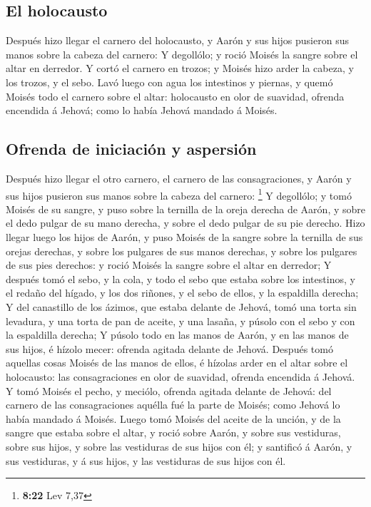 \hypertarget{el-holocausto}{%
\subsection{El holocausto}\label{el-holocausto}}

 Después hizo llegar el carnero del holocausto, y Aarón y
sus hijos pusieron sus manos sobre la cabeza del carnero:
 Y degollólo; y roció Moisés la sangre sobre el altar en
derredor.  Y cortó el carnero en trozos; y Moisés hizo
arder la cabeza, y los trozos, y el sebo.  Lavó luego con
agua los intestinos y piernas, y quemó Moisés todo el carnero sobre el
altar: holocausto en olor de suavidad, ofrenda encendida á Jehová; como
lo había Jehová mandado á Moisés.

\hypertarget{ofrenda-de-iniciaciuxf3n-y-aspersiuxf3n}{%
\subsection{Ofrenda de iniciación y
aspersión}\label{ofrenda-de-iniciaciuxf3n-y-aspersiuxf3n}}

 Después hizo llegar el otro carnero, el carnero de las
consagraciones, y Aarón y sus hijos pusieron sus manos sobre la cabeza
del carnero: \footnote{\textbf{8:22} Lev 7,37}  Y
degollólo; y tomó Moisés de su sangre, y puso sobre la ternilla de la
oreja derecha de Aarón, y sobre el dedo pulgar de su mano derecha, y
sobre el dedo pulgar de su pie derecho.  Hizo llegar
luego los hijos de Aarón, y puso Moisés de la sangre sobre la ternilla
de sus orejas derechas, y sobre los pulgares de sus manos derechas, y
sobre los pulgares de sus pies derechos: y roció Moisés la sangre sobre
el altar en derredor;  Y después tomó el sebo, y la cola,
y todo el sebo que estaba sobre los intestinos, y el redaño del hígado,
y los dos riñones, y el sebo de ellos, y la espaldilla derecha;
 Y del canastillo de los ázimos, que estaba delante de
Jehová, tomó una torta sin levadura, y una torta de pan de aceite, y una
lasaña, y púsolo con el sebo y con la espaldilla derecha;
 Y púsolo todo en las manos de Aarón, y en las manos de
sus hijos, é hízolo mecer: ofrenda agitada delante de Jehová.
 Después tomó aquellas cosas Moisés de las manos de
ellos, é hízolas arder en el altar sobre el holocausto: las
consagraciones en olor de suavidad, ofrenda encendida á Jehová.
 Y tomó Moisés el pecho, y meciólo, ofrenda agitada
delante de Jehová: del carnero de las consagraciones aquélla fué la
parte de Moisés; como Jehová lo había mandado á Moisés. 
Luego tomó Moisés del aceite de la unción, y de la sangre que estaba
sobre el altar, y roció sobre Aarón, y sobre sus vestiduras, sobre sus
hijos, y sobre las vestiduras de sus hijos con él; y santificó á Aarón,
y sus vestiduras, y á sus hijos, y las vestiduras de sus hijos con él.

